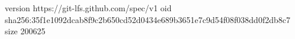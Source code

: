version https://git-lfs.github.com/spec/v1
oid sha256:35f1e1092dcab8f9c2b650cd52d0434e689b3651e7c9d54f08f038dd0f2db8c7
size 200625
